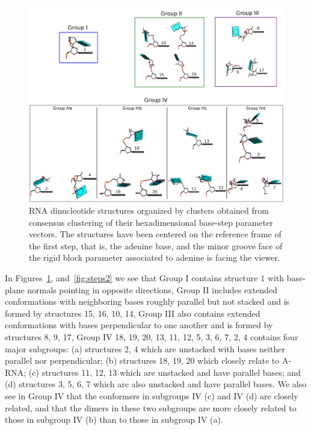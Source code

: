 \begin{figure}[htbp]
 \centering
\includegraphics[angle=90, scale=0.5]{Chapter2/collageb.png}
 \caption{RNA dinucleotide structures  organized by clusters obtained
   from  consensus  clustering   of  their  hexadimensional  base-step
   parameter  vectors.  The  structures  have  been  centered  on  the
   reference frame of  the first step, that is,  the adenine base, and
   the minor  groove face of  the rigid block parameter  associated to
   adenine is facing the viewer.}
 \label{fig:nonAclus}
\end{figure}

In Figures~\ref{fig:nonAclus}, and~\ref{fig:steps2}  we see that Group
I contains structure {1}  with base-plane normals pointing in opposite
directions, Group II  includes extended conformations with neighboring
bases roughly  parallel but  not stacked and  is formed  by structures
{15, 16, 10, 14}, Group  III also contains extended conformations with
bases perpendicular to one another  and is formed by structures {8, 9,
  17}, Group IV  {18, 19, 20, 13, 11,  12, 5, 3, 6, 7,  2, 4} contains
four major subgroups:  (a) structures {2, 4} which  are unstacked with
bases neither parallel nor  perpendicular; (b) structures {18, 19, 20}
which closely relate  to A-RNA; (c) structures {11,  12, 13} which are
unstacked and  have parallel  bases; and (d)  structures {3, 5,  6, 7}
which are also unstacked and have parallel bases. We also see in Group
IV that  the conformers  in subgroups  IV (c) and  IV (d)  are closely
related, and that  the dimers in these two  subgroups are more closely
related to those in subgroup IV (b) than to those in subgroup IV (a).

